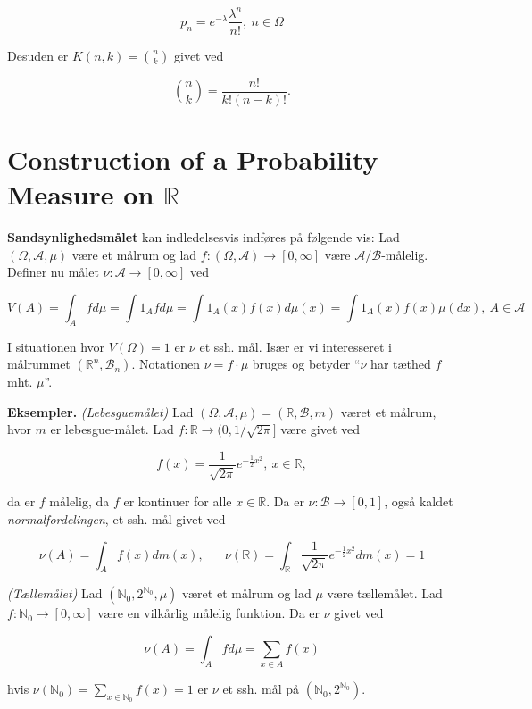 \documentclass[a4paper,12pt,openany]{book}
\begin{document}
\[
p_n=e^{-\lambda}\frac{\lambda^n}{n!},\ n\in\Omega
\]

Desuden er \(K(n,k)={n\choose k}\) givet ved

\[
{n\choose k}=\frac{n!}{k!(n-k)!}.
\]

\hypertarget{construction-of-a-probability-measure-on-mathbb-r}{%
\section{\texorpdfstring{Construction of a Probability Measure on \(\mathbb R\)}{Construction of a Probability Measure on \textbackslash mathbb R}}\label{construction-of-a-probability-measure-on-mathbb-r}}

\textbf{Sandsynlighedsmålet} kan indledelsesvis indføres på følgende vis: Lad \((\Omega, \mathcal{A},\mu)\) være et målrum og lad \(f : (\Omega,\mathcal{A}) \to [0,\infty]\) være \(\mathcal{A}/\mathcal{B}\)-målelig. Definer nu målet \(\nu : \mathcal{A} \to [0,\infty]\) ved

\[
V(A)=\int_A f d\mu=\int 1_A fd\mu=\int 1_A(x)f(x)d\mu(x)=\int1_A(x)f(x)\mu(dx),\ A\in\mathcal{A}
\]

I situationen hvor \(V(\Omega)=1\) er \(\nu\) et ssh. mål. Især er vi interesseret i målrummet \((\mathbb{R}^n,\mathcal{B}_n)\). Notationen \(\nu =f\cdot \mu\) bruges og betyder ``\(\nu\) har tæthed \(f\) mht. \(\mu\)''.

\textbf{Eksempler.} \emph{(Lebesguemålet)} Lad \((\Omega,\mathcal{A},\mu)=(\mathbb{R},\mathcal{B},m)\) været et målrum, hvor \(m\) er lebesgue-målet. Lad \(f : \mathbb{R}\to (0,1/\sqrt{2\pi}]\) være givet ved

\[
f(x)=\frac{1}{\sqrt{2\pi}}e^{-\frac{1}{2}x^2},\ x\in\mathbb{R},
\]

da er \(f\) målelig, da \(f\) er kontinuer for alle \(x\in\mathbb{R}\). Da er \(\nu : \mathcal{B} \to [0,1]\), også kaldet \emph{normalfordelingen}, et ssh. mål givet ved

\[
\nu(A)=\int_A f(x) dm(x),\hspace{20pt} \nu(\mathbb{R})=\int_{\mathbb{R}}\frac{1}{\sqrt{2\pi}}e^{-\frac{1}{2}x^2}dm(x)=1
\]

\emph{(Tællemålet)} Lad \((\mathbb{N}_0,2^{\mathbb{N}_0},\mu)\) været et målrum og lad \(\mu\) være tællemålet. Lad \(f : \mathbb{N}_0 \to [0,\infty]\) være en vilkårlig målelig funktion. Da er \(\nu\) givet ved

\[
\nu(A)=\int_A fd\mu=\sum_{x\in A}f(x)
\]

hvis \(\nu(\mathbb{N}_0)=\sum_{x\in\mathbb{N}_0}f(x)=1\) er \(\nu\) et ssh. mål på \((\mathbb{N}_0,2^{\mathbb{N}_0})\).
\end{document}
